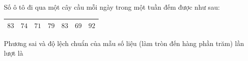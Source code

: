 \begin{ex}
Số ô tô đi qua một cây cầu mỗi ngày trong một tuần đếm được như sau:
\begin{center}
\begin{tabular}{|c|c|c|c|c|c|c|}\hline
$83$ & $74$ & $71$ & $79$ & $83$ & $69$ & $92$\\\hline
\end{tabular}
\end{center}
Phương sai và độ lệch chuẩn của mẫu số liệu (làm tròn đến hàng phần trăm) lần lượt là
\end{ex}
